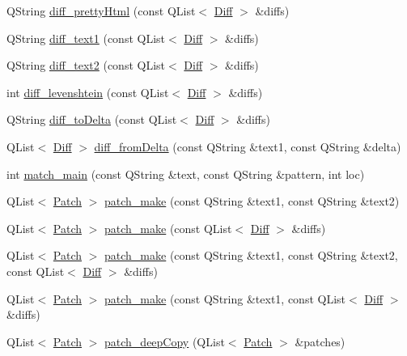 \begin{DoxyCompactItemize}
\item 
Q\+String \hyperlink{classdiff__match__patch_a3eeaf8a99e5d6f53e8994128d64f57f1}{diff\+\_\+pretty\+Html} (const Q\+List$<$ \hyperlink{class_diff}{Diff} $>$ \&diffs)
\item 
Q\+String \hyperlink{classdiff__match__patch_a6a1995ece702b50091f3883518864ea7}{diff\+\_\+text1} (const Q\+List$<$ \hyperlink{class_diff}{Diff} $>$ \&diffs)
\item 
Q\+String \hyperlink{classdiff__match__patch_a9d3e1424496704a7e1d1f7995d465f20}{diff\+\_\+text2} (const Q\+List$<$ \hyperlink{class_diff}{Diff} $>$ \&diffs)
\item 
int \hyperlink{classdiff__match__patch_a5183e0300c4fbe6b993cae9844f57c11}{diff\+\_\+levenshtein} (const Q\+List$<$ \hyperlink{class_diff}{Diff} $>$ \&diffs)
\item 
Q\+String \hyperlink{classdiff__match__patch_acc6b4e2d43c1be99c291049810bfc654}{diff\+\_\+to\+Delta} (const Q\+List$<$ \hyperlink{class_diff}{Diff} $>$ \&diffs)
\item 
Q\+List$<$ \hyperlink{class_diff}{Diff} $>$ \hyperlink{classdiff__match__patch_a70e244439ed3261a2a2c2ce092c45bc0}{diff\+\_\+from\+Delta} (const Q\+String \&text1, const Q\+String \&delta)
\item 
int \hyperlink{classdiff__match__patch_aab1a27bfbb05e041a969617bf6594c23}{match\+\_\+main} (const Q\+String \&text, const Q\+String \&pattern, int loc)
\item 
Q\+List$<$ \hyperlink{class_patch}{Patch} $>$ \hyperlink{classdiff__match__patch_afb9335ec40ffb7b74a822a1210d90e19}{patch\+\_\+make} (const Q\+String \&text1, const Q\+String \&text2)
\item 
Q\+List$<$ \hyperlink{class_patch}{Patch} $>$ \hyperlink{classdiff__match__patch_ac5992f58192fc44530f33dd40202c165}{patch\+\_\+make} (const Q\+List$<$ \hyperlink{class_diff}{Diff} $>$ \&diffs)
\item 
Q\+List$<$ \hyperlink{class_patch}{Patch} $>$ \hyperlink{classdiff__match__patch_aaf3ea8fa0cd411d87dc465544fa68ac1}{patch\+\_\+make} (const Q\+String \&text1, const Q\+String \&text2, const Q\+List$<$ \hyperlink{class_diff}{Diff} $>$ \&diffs)
\item 
Q\+List$<$ \hyperlink{class_patch}{Patch} $>$ \hyperlink{classdiff__match__patch_a7fe185270bdffc221bd36f3f72635298}{patch\+\_\+make} (const Q\+String \&text1, const Q\+List$<$ \hyperlink{class_diff}{Diff} $>$ \&diffs)
\item 
Q\+List$<$ \hyperlink{class_patch}{Patch} $>$ \hyperlink{classdiff__match__patch_aa4b405c41f79af23a8e60129c8e9a721}{patch\+\_\+deep\+Copy} (Q\+List$<$ \hyperlink{class_patch}{Patch} $>$ \&patches)

\end{DoxyCompactItemize}
